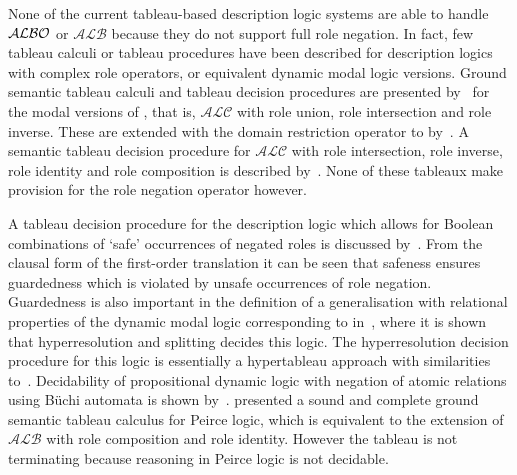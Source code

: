 \documentclass[leqno
,pdflatex
,prodmode
,acmtocl
]{acmsmall}
\newcommand{\mathcmd}[1]{\ensuremath{#1}\xspace}
\newcommand{\dlfont}{\mathcal}
\newcommand{\dl}[1]{\mathcmd{\dlfont{#1}}}
\newcommand{\ALBOid}{\dl{ALBO\smash[t]{\mbox{}}}}
\newcommand{\ALC}{\dl{ALC}}
\newcommand{\ALB}{\dl{ALB}}
\newcommand{\ALCQIb}{\xspace}
\begin{document}
None of the current tableau-based description
logic systems are able to handle \ALBOid or \ALB because they
do not support full role negation.
In fact, few tableau calculi or tableau procedures have been described for
description logics with complex role operators, or equivalent dynamic
modal logic versions.
Ground semantic tableau calculi and tableau decision procedures
are presented by~ for the modal
versions of , that is, \ALC with role union, role
intersection and role inverse. These are extended with the domain restriction
operator to  by~.
A semantic tableau decision procedure for \ALC with role intersection,
role inverse, role identity and role composition is described
by~.
None of these tableaux make provision for the role negation operator however.

A tableau decision procedure for the description logic \ALCQIb which
allows for Boolean combinations of `safe' occurrences of negated
roles is discussed by~.
From the clausal form of the first-order translation it can be seen that
safeness ensures guardedness which is
violated by unsafe occurrences of role negation.
Guardedness is also important in the definition of a generalisation 
with relational properties of the dynamic modal logic corresponding to
 in~, where it
is shown that hyperresolution and splitting decides this logic.
The hyperresolution decision procedure for this logic is essentially a
hypertableau approach with similarities to~.
Decidability of propositional dynamic logic with negation of atomic
relations using B\"uchi automata is shown by~.
 presented a sound and complete ground
semantic tableau calculus for Peirce logic, which is equivalent to the extension of \ALB with role composition and
role identity.
However the tableau is not terminating because reasoning in Peirce
logic is not decidable.
\end{document}
